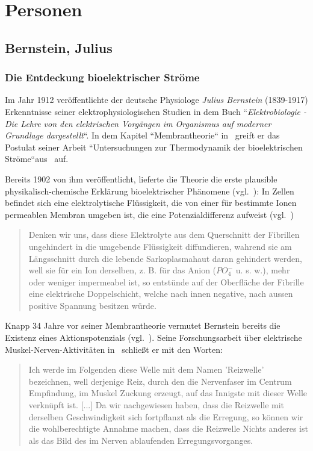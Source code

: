 \chapter{Personen}

\section{Bernstein, Julius}\label{appendix:bernstein}

\subsection*{Die Entdeckung bioelektrischer Ströme}

Im Jahr 1912 veröffentlichte der deutsche Physiologe \textit{Julius Bernstein} (1839-1917) Erkenntnisse seiner elektrophysiologischen Studien in dem Buch ``\textit{Elektrobiologie - Die Lehre von den elektrischen Vorgängen im Organismus auf moderner Grundlage dargestellt}``.
In dem Kapitel ``Membrantheorie`` in~\cite{Ber12} greift er das Postulat seiner Arbeit ``Untersuchungen zur Thermodynamik der bioelektrischen Ströme``aus~\cite{Ber02} auf.

Bereits 1902 von ihm veröffentlicht, lieferte die Theorie die erste plausible physikalisch-chemische Erklärung bioelektrischer Phänomene (vgl.~\cite[5]{Sey06}): In Zellen befindet sich eine elektrolytische Flüssigkeit, die von einer für bestimmte Ionen permeablen Membran umgeben ist, die eine Potenzialdifferenz aufweist (vgl.~\cite[92 f.]{Ber12})

\blockquote[{\cite[542]{Ber02}}]{
    Denken wir uns, dass diese Elektrolyte aus dem Querschnitt der Fibrillen ungehindert in die umgebende Flüssigkeit diffundieren, wahrend sie am Längsschnitt durch die lebende Sarkoplasmahaut daran gehindert werden, well sie für ein Ion derselben, z. B. für das Anion ($PO^-_4$ u. s. w.), mehr oder weniger impermeabel ist, so entstünde auf der Oberfläche der Fibrille eine elektrische Doppelschicht, welche nach innen negative, nach aussen positive Spannung besitzen würde.
}

Knapp 34 Jahre vor seiner Membrantheorie vermutet Bernstein bereits die Existenz eines Aktionspotenzials (vgl.~\cite[168]{Sch83}). Seine Forschungsarbeit über elektrische Muskel-Nerven-Aktivitäten in~\cite{Ber68} schließt er mit den Worten:

\blockquote[{\cite[198 f.]{Ber68}}]{
    Ich werde im Folgenden diese Welle mit dem Namen 'Reizwelle' bezeichnen, well derjenige Reiz, durch den die Nervenfaser im Centrum Empfindung, im Muskel Zuckung erzeugt, auf das  Innigste mit dieser Welle verknüpft ist. {[...]} Da wir nachgewiesen haben, dass die Reizwelle mit derselben Geschwindigkeit sich fortpflanzt als die Erregung, so können wir die wohlberechtigte Annahme machen, dass die Reizwelle Nichts anderes ist als das Bild des im Nerven ablaufenden Erregungsvorganges.
}

